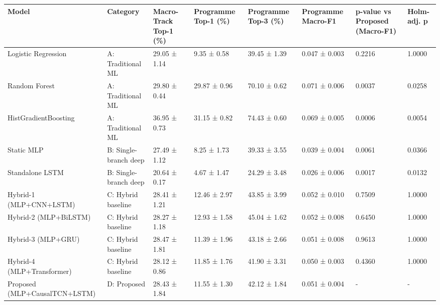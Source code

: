 \begin{tabular}{llllllll}
\toprule
Model & Category & Macro-Track Top-1 (\%) & Programme Top-1 (\%) & Programme Top-3 (\%) & Programme Macro-F1 & p-value vs Proposed (Macro-F1) & Holm-adj. p \\
\midrule
Logistic Regression & A: Traditional ML & 29.05 ± 1.14 & 9.35 ± 0.58 & 39.45 ± 1.39 & 0.047 ± 0.003 & 0.2216 & 1.0000 \\
Random Forest & A: Traditional ML & 29.80 ± 0.44 & 29.87 ± 0.96 & 70.10 ± 0.62 & 0.071 ± 0.006 & 0.0037 & 0.0258 \\
HistGradientBoosting & A: Traditional ML & 36.95 ± 0.73 & 31.15 ± 0.82 & 74.43 ± 0.60 & 0.069 ± 0.005 & 0.0006 & 0.0054 \\
Static MLP & B: Single-branch deep & 27.49 ± 1.12 & 8.25 ± 1.73 & 39.33 ± 3.55 & 0.039 ± 0.004 & 0.0061 & 0.0366 \\
Standalone LSTM & B: Single-branch deep & 20.64 ± 0.17 & 4.67 ± 1.47 & 24.29 ± 3.48 & 0.026 ± 0.006 & 0.0017 & 0.0132 \\
Hybrid-1 (MLP+CNN+LSTM) & C: Hybrid baseline & 28.41 ± 1.21 & 12.46 ± 2.97 & 43.85 ± 3.99 & 0.052 ± 0.010 & 0.7509 & 1.0000 \\
Hybrid-2 (MLP+BiLSTM) & C: Hybrid baseline & 28.27 ± 1.18 & 12.93 ± 1.58 & 45.04 ± 1.62 & 0.052 ± 0.008 & 0.6450 & 1.0000 \\
Hybrid-3 (MLP+GRU) & C: Hybrid baseline & 28.47 ± 1.81 & 11.39 ± 1.96 & 43.18 ± 2.66 & 0.051 ± 0.008 & 0.9613 & 1.0000 \\
Hybrid-4 (MLP+Transformer) & C: Hybrid baseline & 28.12 ± 0.86 & 11.85 ± 1.76 & 41.90 ± 3.31 & 0.050 ± 0.003 & 0.4360 & 1.0000 \\
Proposed (MLP+CausalTCN+LSTM) & D: Proposed & 28.43 ± 1.84 & 11.55 ± 1.30 & 42.12 ± 1.84 & 0.051 ± 0.004 & - & - \\
\bottomrule
\end{tabular}
